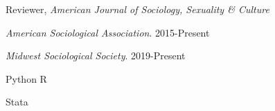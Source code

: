\documentclass[11pt,article,oneside]{memoir}
\begin{document}
\ind Reviewer, \emph{American Journal of Sociology, Sexuality \& Culture}


\bigskip
{}
\medskip

\ind \emph{American Sociological Association}. 2015-Present

\ind \emph{Midwest Sociological Society}. 2019-Present



\bigskip

\medskip

\ind  Python \hspace{0.4in}  R

\newline \noindent Stata
\end{document}
